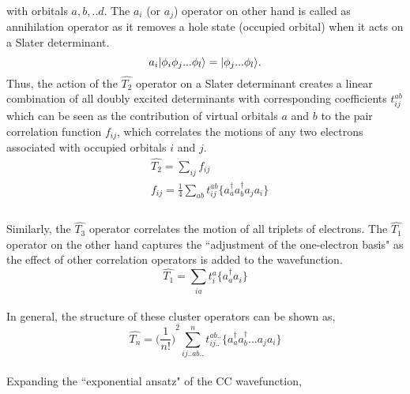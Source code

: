 with orbitals $a,b,..d$. The $a_i$ (or $a_j$) operator on other hand is called 
as annihilation operator as it removes a hole state (occupied orbital) when it 
acts on a Slater determinant.
\begin{equation}
a_i| \phi_i\phi_j...\phi_l \rangle = | \phi_j...\phi_l \rangle.
\end{equation}
Thus, the action of the $\hat{T_2} $ operator on a Slater determinant creates a 
linear combination of all doubly excited determinants with corresponding coefficients
$t^{ab}_{ij}$ which can be seen as the contribution of virtual orbitals $a$ and $b$
to the pair correlation function $f_{ij}$, which correlates the motions of any two 
electrons associated with occupied orbitals $i$ and $j$. 
\\
\begin{equation}
\begin{split}
& \hat{T_2} = \sum_{ij}f_{ij} \\
& f_{ij} = \frac{1}{4}\sum_{ab}t^{ab}_{ij}\{a^\dagger_aa^\dagger_ba_ja_i\}\\
\end{split}
\end{equation}
\\
Similarly, the ${\hat{T_3}}$ operator correlates the motion of all triplets of electrons. 
The $\hat{T_1}$ operator on the other hand captures the ``adjustment of the one-electron basis"\cite{Crawford00} 
as the effect of other correlation operators is added to the wavefunction.
\\
\begin{equation}
\hat{T_1} = \sum_{ia}t^a_i\{{a}^\dagger_a a_i\}
\end{equation}
\\
In general, the structure of these cluster operators can be shown as,
\\
\begin{equation}
\hat{T_n} = {\bigg(\frac{1}{n!}\bigg)}^2\sum_{ij..ab..}^nt^{ab..}_{ij..}\{a^\dagger_aa^\dagger_b...a_ja_i\}
\end{equation}
\\
Expanding the ``exponential ansatz" of the CC wavefunction,
